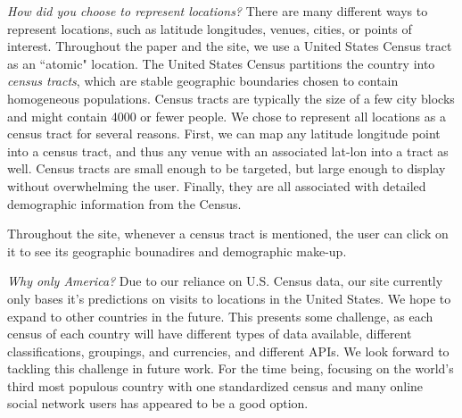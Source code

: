 \emph{How did you choose to represent locations?}
There are many different ways to represent locations, such as latitude longitudes, venues, cities, or points of interest.
Throughout the paper and the site, we use a United States Census tract as an ``atomic" location.
The United States Census partitions the country into \emph{census tracts}, which are stable geographic boundaries chosen to contain homogeneous populations.
Census tracts are typically the size of a few city blocks and might contain 4000 or fewer people.
We chose to represent all locations as a census tract for several reasons.
First, we can map any latitude longitude point into a census tract, and thus any venue with an associated lat-lon into a tract as well.
Census tracts are small enough to be targeted, but large enough to display without overwhelming the user.
Finally, they are all associated with detailed demographic information from the Census.

Throughout the site, whenever a census tract is mentioned, the user can click on it to see its geographic bounadires and demographic make-up.

\emph{Why only America?}
Due to our reliance on U.S. Census data, our site currently only bases it's predictions on visits to locations in the United States. We hope to expand to other countries in the future. This presents some challenge, as each census of each country will have different types of data available, different classifications, groupings, and currencies, and different APIs. We look forward to tackling this challenge in future work. For the time being, focusing on the world's third most populous country with one standardized census and many online social network users has appeared to be a good option.

